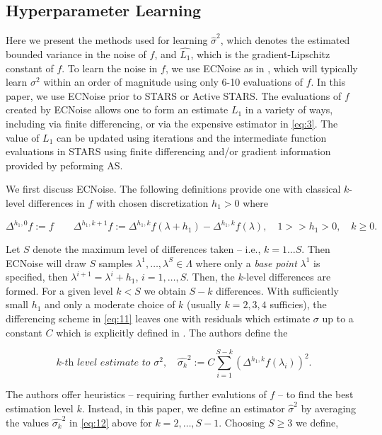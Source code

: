 \documentclass{amsart}
\begin{document}
\subsection{Hyperparameter Learning}

Here we present the methods used for learning $\hat{\sigma}^2$, which denotes the estimated bounded variance in the noise of $f$, and $\hat{L_1}$, which is the gradient-Lipschitz constant of $f$. To learn the noise in $f$, we use ECNoise as in \cite{MW}, which will typically learn $\sigma^2$ within an order of magnitude using only 6-10 evaluations of $f$. In this paper, we use ECNoise prior to STARS or Active STARS. The evaluations of $f$ created by ECNoise allows one to form an estimate $L_1$ in a variety of ways, including via finite differencing, or via the expensive estimator in \eqref{eq:3}. The value of $L_1$ can be updated using iterations and the intermediate function evaluations in STARS using finite differencing and/or gradient information provided by peforming AS.

We first discuss ECNoise. The following definitions provide one with classical $k$-level differences in $f$ with chosen discretization $h_1>0$ where

\begin{equation} \label{eq:13}
\Delta^{h_1,0} f :=f \quad \quad \Delta^{h_1,k+1} f:=\Delta^{h_1,k} f(\lambda+h_1)- \Delta^{h_1,k} f(\lambda), \quad 1>>h_1>0, \quad k \geq 0.
\end{equation}  

\noindent Let $S$ denote the maximum level of differences taken -- i.e., $k=1\ldots S$. Then ECNoise will draw $S$ samples $\lambda^1,\ldots,\lambda^S \in \Lambda$ where only a \textit{base point} $\lambda^1$ is specified, then $\lambda^{i+1}=\lambda^{i}+h_1$, $i=1,\ldots,S$. Then, the $k$-level differences are formed. For a given level $k< S$ we obtain $S-k$ differences. With sufficiently small $h_1$ and only a moderate choice of $k$ (usually $k=2,3,4$ sufficies), the differencing scheme in \eqref{eq:11} leaves one with residuals which estimate $\sigma$ up to a constant $C$ which is explicitly defined in \cite{MW}. The authors define the



\begin{equation} \label{eq:14}
\textit{$k$-th level estimate to $\sigma^2,$}\quad \hat{\sigma_k}^2:=C\sum_{i=1}^{S-k}\left(\Delta^{h_1,k}f(\lambda_i)\right)^2.
\end{equation}  

The authors offer heuristics -- requiring further evalutions of $f$ -- to find the best estimation level $k$. Instead, in this paper, we define an estimator $\hat{\sigma}^2$ by averaging the values $\hat{\sigma_k}^2$ in \eqref{eq:12} above for $k=2,\ldots,S-1.$ Choosing $S\geq 3$ we define,
\end{document}

